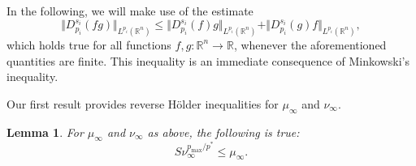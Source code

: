 \documentclass[11pt]{amsart}
\theoremstyle{plain}
\newtheorem{lemma}[theorem]{Lemma}
\theoremstyle{definition}
\numberwithin{equation}{section}
\newcommand{\R}{\mathbb{R}}
\begin{document}
In the following, we will make use of the estimate
\begin{equation}\label{eq:minkw}
 \Vert D^{s_i}_{p_i}(f g)\Vert_{L^{p_i}(\R^n)} \le \Vert D^{s_i}_{p_i}(f)g\Vert_{L^{p_i}(\R^n)} + \Vert D^{s_i}_{p_i}(g)f \Vert_{L^{p_i}(\R^n)},
\end{equation}
which holds true for all functions $f,g:\R^n\to\R$, whenever the aforementioned quantities are finite.
This inequality is an immediate consequence of Minkowski's inequality.

Our first result provides reverse H\"older inequalities for $\mu_{\infty}$ and $\nu_{\infty}$.
\begin{lemma}\label{lem:inftyrevHolder} 
For $\mu_{\infty}$ and $\nu_{\infty}$ as above, the following is true:
\[S\nu_{\infty}^{p_{\max}/p^{\ast}} \leq \mu_{\infty}.\]
\end{lemma}
\end{document}
